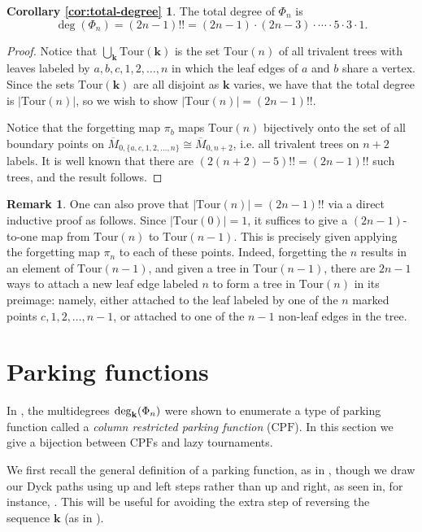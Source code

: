\documentclass[11pt]{amsart}
\newcommand{\Mbar}{\overline{M}}
\newcommand{\CPF}{\mathrm{CPF}}
\newcommand{\emb}{\Phi}
\newcommand{\Tour}{\mathrm{Tour}}
\numberwithin{thm}{section}
\numberwithin{equation}{section}
\numberwithin{figure}{section}
\theoremstyle{definition}
\newtheorem{remark}[thm]{Remark}
\newtheorem*{TotalCor}{Corollary \ref{cor:total-degree}}
\begin{document}
\begin{TotalCor}
  The total degree of $\emb_n$ is $$\deg(\emb_n)=(2n-1)!!=(2n-1)\cdot (2n-3)\cdot \cdots \cdot 5 \cdot 3 \cdot 1.$$
\end{TotalCor}
 
\begin{proof}
  Notice that $\bigcup_{\mathbf{k}}\Tour(\mathbf{k})$ is the set $\Tour(n)$ of all trivalent trees with leaves labeled by $a,b,c,1,2,\ldots,n$ in which the leaf edges of $a$ and $b$ share a vertex. Since the sets $\Tour(\mathbf{k})$ are all disjoint as $\mathbf{k}$ varies, we have that the total degree is $|\Tour(n)|$, so we wish to show $|\Tour(n)|=(2n-1)!!$.
  
  Notice that the forgetting map $\pi_b$ maps $\Tour(n)$ bijectively onto the set of all boundary points on $\Mbar_{0,\{a,c,1,2,\ldots,n\}}\cong \Mbar_{0,n+2}$, i.e. all trivalent trees on $n+2$ labels.  It is well known that there are $(2(n+2)-5)!!=(2n-1)!!$ such trees, and the result follows.
\end{proof}

\begin{remark}
One can also prove that $|\Tour(n)|=(2n-1)!!$ via a direct inductive proof as follows. Since $|\Tour(0)|=1$, it suffices to give a $(2n-1)$-to-one map from $\Tour(n)$ to $\Tour(n-1)$.  This is precisely given applying the forgetting map $\pi_n$ to each of these points. Indeed, forgetting the $n$ results in an element of $\Tour(n-1)$, and given a tree in $\Tour(n-1)$, there are $2n-1$ ways to attach a new leaf edge labeled $n$ to form a tree in $\Tour(n)$ in its preimage: namely, either attached to the leaf labeled by one of the $n$ marked points $c,1,2,\ldots,n-1$, or attached to one of the $n-1$ non-leaf edges in the tree.  
\end{remark}

\section{Parking functions} \label{sec:PFs}

In \cite{CGM}, the multidegrees $\deg_{\bf k}(\emb_n)$ were shown to enumerate a type of parking function called a \textit{column restricted parking function} ($\CPF$). In this section we give a bijection between $\CPF$s and lazy tournaments.

We first recall the general definition of a parking function, as in \cite{HaglundBook}, though we draw our Dyck paths using up and left steps rather than up and right, as seen in, for instance, \cite{Blasiaketc}.  This will be useful for avoiding the extra step of reversing the sequence $\mathbf{k}$ (as in \cite{CGM}).
\end{document}

